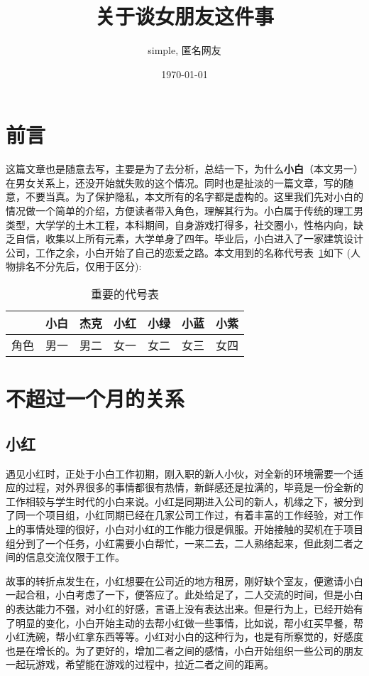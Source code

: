 \documentclass{article}
\title{\textbf{关于谈女朋友这件事}}
\author{simple, 匿名网友}
\date{\today}
\begin{document}
\maketitle

\section{前言}
这篇文章也是随意去写，主要是为了去分析，总结一下，为什么\textbf{小白}（本文男一）在男女关系上，还没开始就失败的这个情况。同时也是扯淡的一篇文章，写的随意，不要当真。为了保护隐私，本文所有的名字都是虚构的。这里我们先对小白的情况做一个简单的介绍，方便读者带入角色，理解其行为。小白属于传统的理工男类型，大学学的土木工程，本科期间，自身游戏打得多，社交圈小，性格内向，缺乏自信，收集以上所有元素，大学单身了四年。毕业后，小白进入了一家建筑设计公司，工作之余，小白开始了自己的恋爱之路。本文用到的名称代号表~\ref{name_replace}如下 (人物排名不分先后，仅用于区分):


\begin{table}[h]
    \caption{重要的代号表}
    \label{name_replace}
    \centering
    \begin{tabular}{ccccccc}
        \toprule
        & 小白 & 杰克 & 小红 & 小绿 & 小蓝 & 小紫\\
        \midrule
        角色 & 男一 & 男二 & 女一 & 女二 & 女三 & 女四\\
        \bottomrule
    \end{tabular}
\end{table}


\section{不超过一个月的关系}
\subsection{小红}
遇见小红时，正处于小白工作初期，刚入职的新人小伙，对全新的环境需要一个适应的过程，对外界很多的事情都很有热情，新鲜感还是拉满的，毕竟是一份全新的工作相较与学生时代的小白来说。小红是同期进入公司的新人，机缘之下，被分到了同一个项目组，小红同期已经在几家公司工作过，有着丰富的工作经验，对工作上的事情处理的很好，小白对小红的工作能力很是佩服。开始接触的契机在于项目组分到了一个任务，小红需要小白帮忙，一来二去，二人熟络起来，但此刻二者之间的信息交流仅限于工作。

故事的转折点发生在，小红想要在公司近的地方租房，刚好缺个室友，便邀请小白一起合租，小白考虑了一下，便答应了。此处给足了，二人交流的时间，但是小白的表达能力不强，对小红的好感，言语上没有表达出来。但是行为上，已经开始有了明显的变化，小白开始主动的去帮小红做一些事情，比如说，帮小红买早餐，帮小红洗碗，帮小红拿东西等等。小红对小白的这种行为，也是有所察觉的，好感度也是在增长的。为了更好的，增加二者之间的感情，小白开始组织一些公司的朋友一起玩游戏，希望能在游戏的过程中，拉近二者之间的距离。
\end{document}
